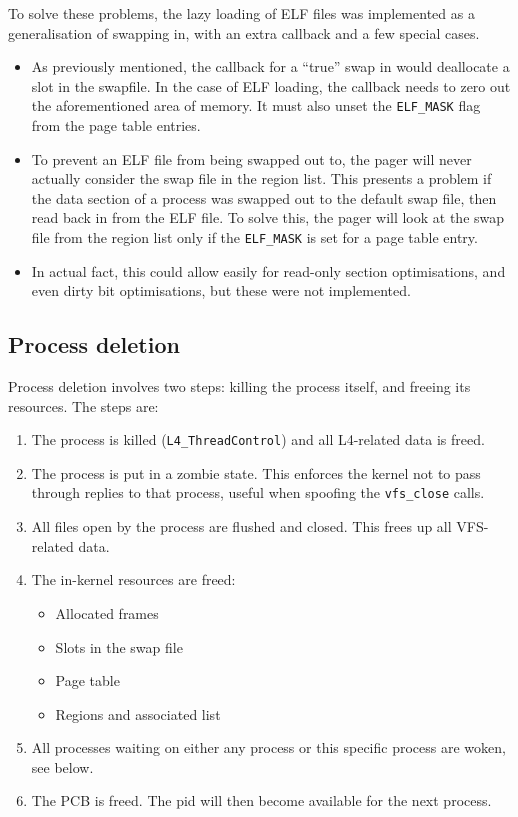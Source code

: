 \documentclass[12pt,english]{article}
\begin{document}
To solve these problems, the lazy loading of ELF files was implemented as a generalisation of swapping in, with an extra callback and a few special cases.
\begin{itemize}
\item As previously mentioned, the callback for a ``true'' swap in would deallocate a slot in the swapfile.  In the case of ELF loading, the callback needs to zero out the aforementioned area of memory.  It must also unset the \texttt{ELF\_MASK} flag from the page table entries.
\item To prevent an ELF file from being swapped out to, the pager will never actually consider the swap file in the region list.  This presents a problem if the data section of a process was swapped out to the default swap file, then read back in from the ELF file.  To solve this, the pager will look at the swap file from the region list only if the \texttt{ELF\_MASK} is set for a page table entry.
\item In actual fact, this could allow easily for read-only section optimisations, and even dirty bit optimisations, but these were not implemented.
\end{itemize}

\subsection{Process deletion} \label{sub:process_delete}

Process deletion involves two steps: killing the process itself, and freeing its resources.  The steps are:

\begin{enumerate}
\item The process is killed (\texttt{L4\_ThreadControl}) and all L4-related data is freed.
\item The process is put in a zombie state.  This enforces the kernel not to pass through replies to that process, useful when spoofing the \texttt{vfs\_close} calls.
\item All files open by the process are flushed and closed.  This frees up all VFS-related data.
\item The in-kernel resources are freed:
\begin{itemize}
\item Allocated frames
\item Slots in the swap file
\item Page table
\item Regions and associated list
\end{itemize}
\item All processes waiting on either any process or this specific process are woken, see below.  
\item The PCB is freed.  The pid will then become available for the next process.
\end{enumerate}
\end{document}
